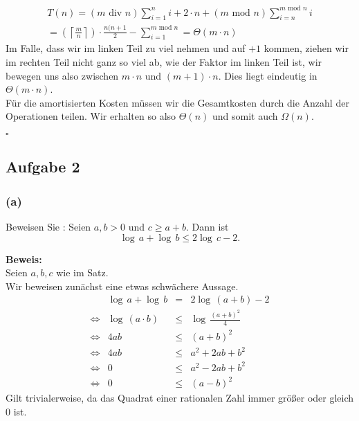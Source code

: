 \documentclass[11pt,a4paper,ngerman]{article}
\begin{document}
   $$\begin{array}{rcl}
      T(n) = (m \text{ div } n) \sum_{i=1}^n i + 2 \cdot n + (m \text{ mod } n) \sum_{i=n}^{m \text{ mod } n} i\\
           = (\left\lceil \frac{m}{n} \right\rceil) \cdot \frac{n(n+1}{2} - \sum_{i=1}^{m \text{ mod } n}
           = \Theta (m \cdot n)
   \end{array}$$
   Im Falle, dass wir im linken Teil zu viel nehmen und auf $+1$ kommen, ziehen wir im rechten Teil nicht ganz so viel ab, wie der Faktor im linken Teil ist,
   wir bewegen uns also zwischen $m \cdot n$ und $(m+1) \cdot n$. Dies liegt eindeutig in $\Theta(m\cdot n)$.\\

   Für die amortisierten Kosten müssen wir die Gesamtkosten durch die Anzahl der Operationen teilen. Wir erhalten so also $\Theta(n)$ und somit auch $\Omega(n)$.

   \mbox{}\hfill$\square$








\subsection*{Aufgabe 2}

\subsubsection*{(a)}
Beweisen Sie : Seien $a,b > 0$ und $c \geq a+ b$. Dann ist
$$
   \log \, a + \log \, b \leq 2 \log \, c - 2.
$$

\noindent\textbf{Beweis:}\\
Seien $a,b,c$ wie im Satz.\\

Wir beweisen zunächst eine etwas schwächere Aussage.
$$\begin{array}{crcl}
   & \log \, a + \log \,b &=& 2 \log \, (a+b) - 2\\
\Leftrightarrow & \log \, (a\cdot b) &\leq & \log \, \frac{(a+b)^2}{4}\\
\Leftrightarrow & 4ab & \leq & (a+b)^2\\
\Leftrightarrow & 4ab & \leq & a^2 + 2ab + b^2\\
\Leftrightarrow & 0 & \leq & a^2 - 2ab + b^2\\
\Leftrightarrow & 0 & \leq & (a-b)^2
\end{array}$$
Gilt trivialerweise, da das Quadrat einer rationalen Zahl immer größer oder gleich $0$ ist.
\end{document}
